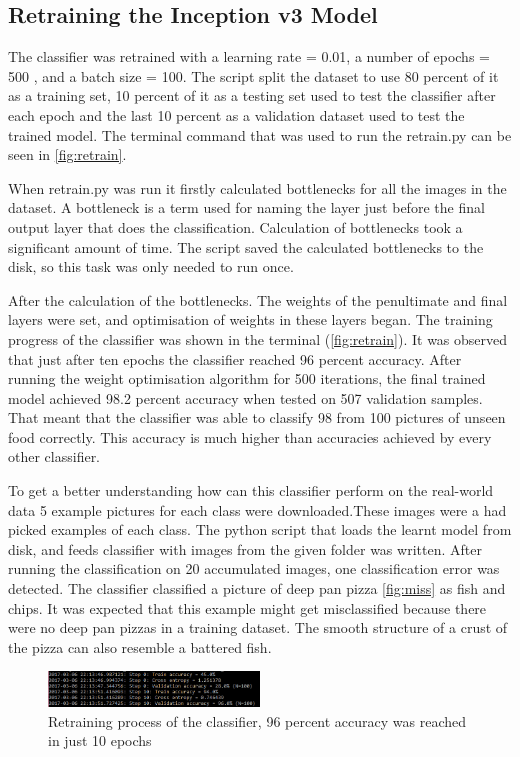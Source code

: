 \subsection{ Retraining the Inception v3 Model}

The classifier was retrained with a learning rate = 0.01, a number of epochs = 500 , and a batch size = 100. The script split the dataset to use 80 percent of it as a training set, 10 percent of it as a testing set used to test the classifier after each epoch and the last 10 percent as a validation dataset used to test the trained model. The terminal command that was used to run the retrain.py can be seen in \autoref{fig:retrain}.

When retrain.py was run it firstly calculated bottlenecks for all the images in the dataset. A bottleneck is a term used for naming the layer just before the final output layer that does the classification. Calculation of bottlenecks took a significant amount of time. The script saved the calculated bottlenecks to the disk, so this task was only needed to run once.

After the calculation of the bottlenecks. The weights of the penultimate and final layers were set, and optimisation of weights in these layers began. The training progress of the classifier was shown in the terminal (\autoref{fig:retrain}). It was observed that just after ten epochs the classifier reached 96 percent accuracy.  After running the weight optimisation algorithm for 500 iterations, the final trained model achieved 98.2 percent accuracy when tested on 507 validation samples. That meant that the classifier was able to classify 98 from 100 pictures of unseen food correctly.  This accuracy is much higher than accuracies achieved by every other classifier.

To get a better understanding how can this classifier perform on the real-world data 5 example pictures for each class were downloaded.These images were a had picked examples of each class. The python script that loads the learnt model from disk, and feeds classifier with images from the given folder was written. After running the classification on 20 accumulated images, one classification error was detected. The classifier classified a picture of deep pan pizza \autoref{fig:miss} as fish and chips. It was expected that this example might get misclassified because there were no deep pan pizzas in a training dataset. The smooth structure of a crust of the pizza can also resemble a battered fish. 


\begin{figure}[h]
\centering
\includegraphics[width=0.5\textwidth]{Figures/4/term-train.PNG}
\caption{Retraining process of the classifier, 96 percent accuracy was reached in just 10 epochs}
\label{fig:retrain-2}
\end{figure}

